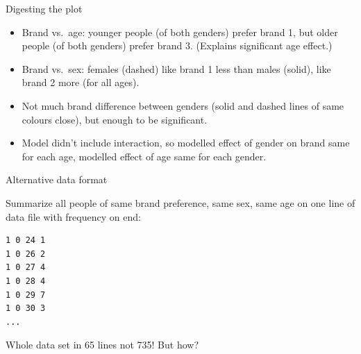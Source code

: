 \documentclass[
  ignorenonframetext,
]{beamer}
\begin{document}
\begin{frame}{Digesting the plot}
\protect\hypertarget{digesting-the-plot}{}

\begin{itemize}
\item
  Brand vs.~age: younger people (of both genders) prefer brand 1, but
  older people (of both genders) prefer brand 3. (Explains significant
  age effect.)
\item
  Brand vs.~sex: females (dashed) like brand 1 less than males (solid),
  like brand 2 more (for all ages).
\item
  Not much brand difference between genders (solid and dashed lines of
  same colours close), but enough to be significant.
\item
  Model didn't include interaction, so modelled effect of gender on
  brand same for each age, modelled effect of age same for each gender.
\end{itemize}

\end{frame}

\begin{frame}[fragile]{Alternative data format}
\protect\hypertarget{alternative-data-format}{}

Summarize all people of same brand preference, same sex, same age on one
line of data file with frequency on end:

\begin{verbatim}
1 0 24 1
1 0 26 2
1 0 27 4
1 0 28 4
1 0 29 7
1 0 30 3
...
\end{verbatim}

Whole data set in 65 lines not 735! But how?

\end{frame}
\end{document}
